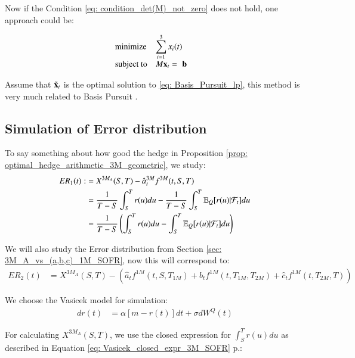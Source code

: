 Now if the Condition \ref{eq: condition_det(M)_not_zero} does not hold, one approach could be:

\begin{align}
\label{eq: Basis_Pursuit_lp}
\begin{array}{ll@{}ll}
\text{minimize}  & \displaystyle\sum\limits_{i=1}^{3}x_{i}(t)&  &\\
\text{subject to}& \displaystyle   M\mathbf{x}_{t} = & \mathbf{b}
\end{array}    
\end{align}

Assume that $\Tilde{\mathbf{x}}_{t}$ is the optimal solution to \ref{eq: Basis_Pursuit_lp}, this method is
very much related to Basis Pursuit \cite{chen1998atomic}.



\newpage 

\subsection{Simulation of Error distribution}

To say something about how good the hedge in Proposition \ref{prop: optimal_hedge_arithmetic_3M_geometric}, we study: 
\begin{align*}
ER_{1}(t) :&= X^{3M_{A}}(S,T) - \hat{a}_{t}^{3M}f^{3M}(t,S,T) \\ 
&= \frac{1}{T-S}\int_{S}^{T}r(u)du - \frac{1}{T-S}\int_{S}^{T}\mathbb{E}_{Q}[r(u)|\mathcal{F}_{t}]du \\ 
&= 
\frac{1}{T-S}\left(
\int_{S}^{T}r(u)du - \int_{S}^{T}\mathbb{E}_{Q}[r(u)|\mathcal{F}_{t}]du
\right)
\end{align*}

We will also study the Error distribution from Section \ref{sec: 3M_A_vs_(a,b,c)_1M_SOFR}, now this will correspond to: 
\begin{align*}
ER_{2}(t) &= 
X^{3M_{A}}(S,T) - \left(
\hat{a}_{t}f^{1M}(t,S,T_{1M}) + 
\hat{b}_{t}f^{1M}(t,T_{1M}, T_{2M}) + 
\hat{c}_{t}f^{1M}(t,T_{2M}, T)
\right)
\end{align*}


We choose the Vasicek model for simulation:
\begin{align*}
dr(t) &= \alpha[m-r(t)]dt + \sigma dW^{Q}(t)    
\end{align*}

For calculating $X^{3M_{A}}(S,T)$, we use the closed expression for $\int_{S}^{T}r(u)du$  as described in Equation \ref{eq: Vasicek_closed_expr_3M_SOFR} p.\pageref{eq: Vasicek_closed_expr_3M_SOFR}:

